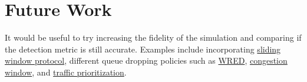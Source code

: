 \documentclass{article}
\begin{document}
\section{Future Work}

It would be useful to try increasing the fidelity of the simulation and comparing if the detection metric is still accurate. Examples include incorporating \href{https://en.wikipedia.org/wiki/Sliding_window_protocol}{sliding window protocol}, different queue dropping policies such as \href{https://en.wikipedia.org/wiki/Weighted_random_early_detection}{WRED}, \href{https://en.wikipedia.org/wiki/TCP_congestion_control#Congestion_window}{congestion window}, and \href{https://flylib.com/books/en/2.809.1.54/1/}{traffic prioritization}.





\end{document}
